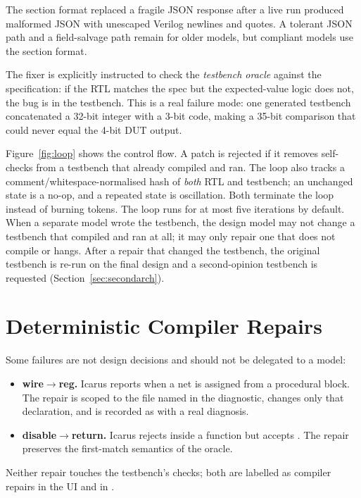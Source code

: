The section format replaced a fragile JSON response after a live run produced
malformed JSON with unescaped Verilog newlines and quotes. A tolerant JSON path and
a field-salvage path remain for older models, but compliant models use the section
format.

The fixer is explicitly instructed to check the \emph{testbench oracle} against the
specification: if the RTL matches the spec but the expected-value logic does not,
the bug is in the testbench. This is a real failure mode: one generated testbench
concatenated a 32-bit integer with a 3-bit code, making a 35-bit comparison that
could never equal the 4-bit DUT output.

Figure~\ref{fig:loop} shows the control flow. A patch is rejected if it removes
self-checks from a testbench that already compiled and ran. The loop also tracks a
comment/whitespace-normalised hash of \emph{both} RTL and testbench; an unchanged
state is a no-op, and a repeated state is oscillation. Both terminate the loop
instead of burning tokens. The loop runs for at most five iterations by default.
When a separate model wrote the testbench, the design model may not change a
testbench that compiled and ran at all; it may only repair one that does not compile
or hangs. After a repair that changed the testbench, the original testbench is
re-run on the final design and a second-opinion testbench is requested
(Section~\ref{sec:secondarch}).


\section{Deterministic Compiler Repairs}
Some failures are not design decisions and should not be delegated to a model:

\begin{itemize}
\item \textbf{wire$\rightarrow$reg.} Icarus reports
 when a net is assigned from a procedural block. The
repair is scoped to the file named in the diagnostic, changes only that declaration,
and is recorded as  with a real diagnosis.
\item \textbf{disable$\rightarrow$return.} Icarus rejects 
inside a function but accepts . The repair preserves the
first-match semantics of the oracle.
\end{itemize}

Neither repair touches the testbench's checks; both are labelled as compiler
repairs in the UI and in .

